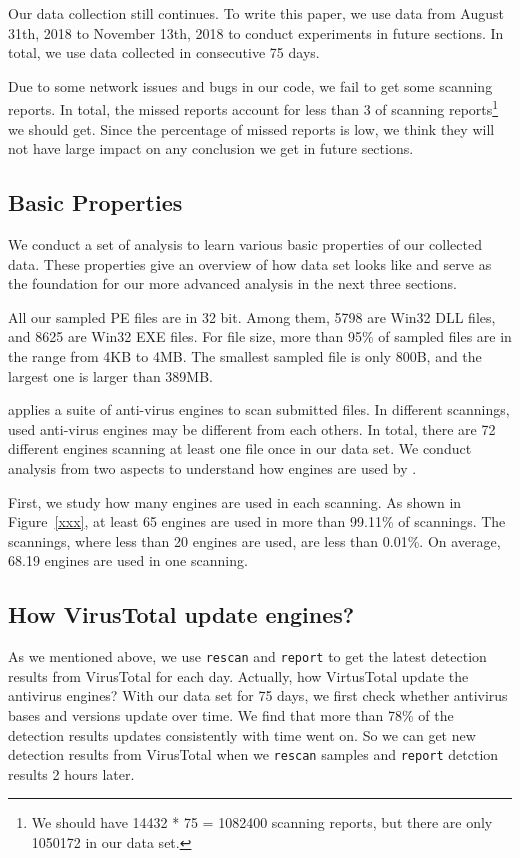 Our data collection still continues. 
To write this paper, we use data from August 31th, 2018 to 
November 13th, 2018 to conduct experiments in future sections. 
In total, we use data collected in consecutive 75 days. 

Due to some network issues and bugs in our code, 
we fail to get some scanning reports. 
In total, the missed reports account for less than 3%
of scanning reports\footnote{We should have 14432 * 75 = 1082400 scanning reports, 
but there are only 1050172 in our data set.}
we should get. 
Since the percentage of missed reports is low, 
we think they will not have large impact on any 
conclusion we get in future sections. 


\subsection{Basic Properties}


We conduct a set of analysis 
to learn various basic properties of our collected data.
These properties give an overview of how data set looks like
and serve as the foundation for our more 
advanced analysis in the next three sections. 

All our sampled PE files are in 32 bit. 
Among them, 5798 are Win32 DLL files, 
and 8625 are Win32 EXE files.
For file size, more than 95\% of sampled files are 
in the range from 4KB to 4MB. 
The smallest sampled file is only 800B, 
and the largest one is larger than 389MB.



\vt{} applies a suite of anti-virus engines to scan submitted files.
In different scannings, used anti-virus engines may be different 
from each others. 
In total, there are 72 different engines scanning 
at least one file once in our data set. 
We conduct analysis from two aspects to 
understand how engines are used by \vt{}.

First, we study how many engines are used in each scanning. 
As shown in Figure~\ref{xxx}, at least 65 engines are used in more 
than 99.11\% of scannings. 
The scannings, where less than 20 engines are used, 
are less than 0.01\%.
On average, 68.19 engines are used in one scanning. 







\subsection{How VirusTotal update engines?}
As we mentioned above, we use \texttt{rescan} and \texttt{report} to get the latest detection results from VirusTotal for each day. Actually, how VirtusTotal update the antivirus engines? With our data set for 75 days, we first check whether antivirus bases and versions update over time. We find that more than 78\% of the detection results updates consistently with time went on. So we can get new detection results from VirusTotal when we \texttt{rescan} samples and \texttt{report} detction results 2 hours later.


